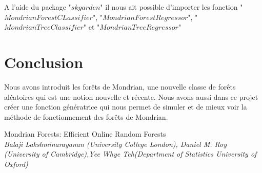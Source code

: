 A l'aide du package "$skgarden$" il nous ait possible d'importer les fonction "$MondrianForestCLassifier$", "$MondrianForestRegressor$",
"$MondrianTreeClassifier$" et
"$MondrianTreeRegressor$"

\newpage

\section{Conclusion}
Nous avons introduit les forêts de Mondrian, une nouvelle classe de forêts aléatoires qui est une notion nouvelle et récente. Nous avons aussi dans ce projet créer une fonction génératrice qui nous permet de simuler et de mieux voir la méthode de fonctionnement des forêts de Mondrian. 


\begin{thebibliography}{99}
 Mondrian Forests: Efficient Online Random Forests\\
{\it Balaji Lakshminarayanan (University College London), Daniel M. Roy (University of Cambridge),Yee Whye Teh(Department of Statistics University of Oxford)}
\end{thebibliography}

\newpage
